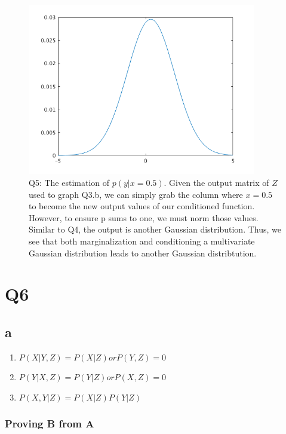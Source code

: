 \documentclass{article}
\begin{document}
\begin{figure}[!ht]
	\centering
	\includegraphics[width=100mm]{conditioned-gaussian.png}
	\caption{Q5: The estimation of $ p(y | x = 0.5) $. Given the output matrix 
of $ Z $ used to graph Q3.b, we can simply grab the column where $ x = 0.5 $ to 
become the new output values of our conditioned function. However, to ensure 
p sums to one, we must norm those values. Similar to Q4, the output is another 
Gaussian distribution. Thus, we see that both marginalization and conditioning 
a multivariate Gaussian distribution leads to another Gaussian distribtution.}
\end{figure}

\section{Q6}

\subsection{a}

\begin{enumerate}[label=\Alph*]
    \item $P(X|Y,Z)=P(X|Z) or P(Y,Z)=0$
    \item $P(Y|X,Z)=P(Y|Z) or P(X,Z)=0$
    \item $P(X,Y|Z)=P(X|Z)P(Y|Z)$
\end{enumerate}

\subsubsection{Proving B from A}
\end{document}
